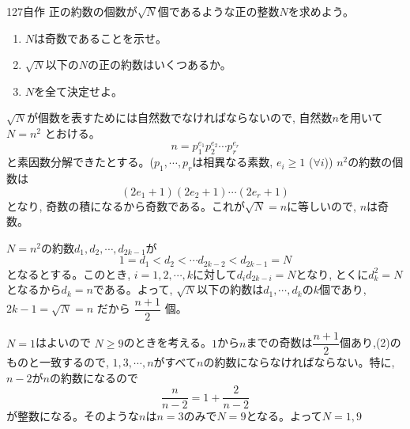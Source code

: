\begin{thm}{127}{}{自作}
 正の約数の個数が$\sqrt{N}$個であるような正の整数$N$を求めよう。
 \begin{enumerate}
  \item $N$は奇数であることを示せ。
  \item $\sqrt{N}$以下の$N$の正の約数はいくつあるか。
  \item $N$を全て決定せよ。
 \end{enumerate}
\end{thm}

$\sqrt{N}$が個数を表すためには自然数でなければならないので,  自然数$n$を用いて $N=n^2$ とおける。
\[n=p_1^{e_1}p_2^{e_2}\cdots p_r^{e_r}\]
と素因数分解できたとする。($p_1, \cdots, p_r$は相異なる素数, $e_i\geq 1$ ($\forall i$)) $n^2$の約数の個数は
\[(2e_1+1)(2e_2+1)\cdots (2e_r +1)\]
となり, 奇数の積になるから奇数である。これが$\sqrt{N}=n$に等しいので, $n$は奇数。

$N=n^2$の約数$d_1,d_2,\cdots, d_{2k-1}$が
\[1=d_1<d_2<\cdots d_{2k-2}<d_{2k-1}=N\]
となるとする。このとき, $i=1,2,\cdots ,k$に対して$d_id_{2k-i}=N$となり, とくに$d_k^2=N$となるから$d_k=n$である。よって, $\sqrt{N}$以下の約数は$d_1,\cdots, d_k$の$k$個であり, $2k-1=\sqrt{N}=n$ だから $\dfrac{n+1}{2}$ 個。

$N=1$はよいので $N\geq 9$のときを考える。$1$から$n$までの奇数は$\dfrac{n+1}{2}$個あり,(2)のものと一致するので, $1,3,\cdots, n$がすべて$n$の約数にならなければならない。特に, $n-2$が$n$の約数になるので
\[\dfrac{n}{n-2}=1+\dfrac{2}{n-2}\]
が整数になる。そのような$n$は$n=3$のみで$N=9$となる。よって$N=1,9$

